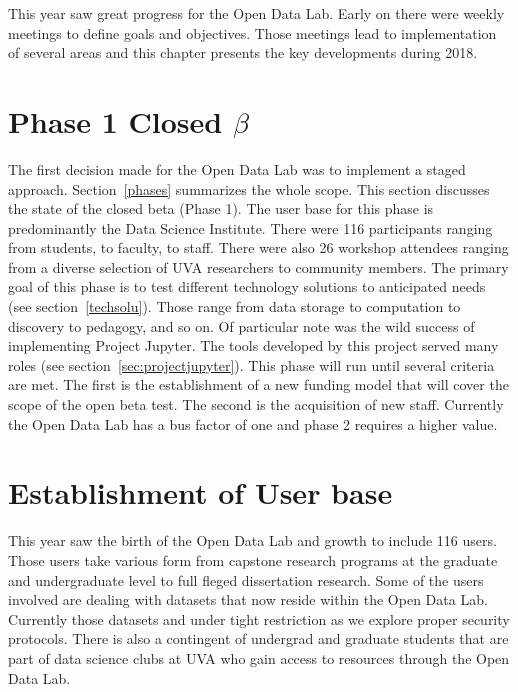 This year saw great progress for the Open Data Lab. Early on there were weekly meetings to define goals and objectives. Those meetings lead to implementation of several areas and this chapter presents the key developments during 2018.

\section{Phase 1 Closed $\beta$}
The first decision made for the Open Data Lab was to implement a staged approach. Section~\ref{phases} summarizes the whole scope. This section discusses the state of the closed beta (Phase 1). The user base for this phase is predominantly the Data Science Institute. There were 116 participants ranging from students, to faculty, to staff. There were also 26 workshop attendees ranging from a diverse selection of UVA researchers to community members.
The primary goal of this phase is to test different technology solutions to anticipated needs (see section~\ref{techsolu}). Those range from data storage to computation to discovery to pedagogy, and so on. Of particular note was the wild success of implementing Project Jupyter. The tools developed by this project served many roles (see section~\ref{sec:projectjupyter}).
This phase will run until several criteria are met. The first is the establishment of a new funding model that will cover the scope of the open beta test. The second is the acquisition of new staff. Currently the Open Data Lab has a bus factor of one and phase 2 requires a higher value. 

\section{Establishment of User base}
This year saw the birth of the Open Data Lab and growth to include 116 users. Those users take various form from capstone research programs at the graduate and undergraduate level to full fleged dissertation research. Some of the users involved are dealing with datasets that now reside within the Open Data Lab. Currently those datasets and under tight restriction as we explore proper security protocols. There is also a contingent of undergrad and graduate students that are part of data science clubs at UVA who gain access to resources through the Open Data Lab.

